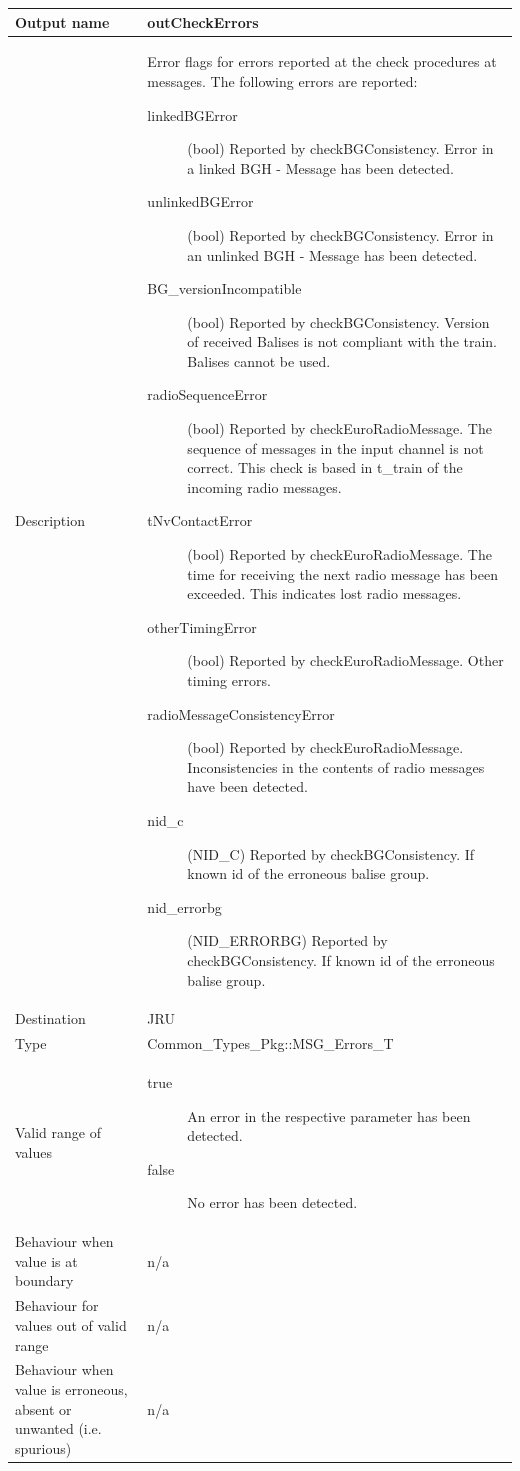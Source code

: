\begin{longtable}{p{}p{}}
\toprule
Output name				& outCheckErrors \\
\midrule
Description				& Error flags for errors reported at the check procedures at messages. The following errors are reported:
\begin{description}
\item[linkedBGError](bool) Reported by checkBGConsistency. Error in a linked BGH - Message has been detected.
\item[unlinkedBGError](bool) Reported by checkBGConsistency. Error in an unlinked BGH - Message has been detected.
\item[BG\_versionIncompatible](bool) Reported by checkBGConsistency. Version of received Balises is not compliant with the train. Balises cannot be used.
\item[radioSequenceError](bool) Reported by checkEuroRadioMessage. The sequence of messages in the input channel is not correct. This check is based in t\_train of the incoming radio messages.
\item[tNvContactError](bool) Reported by checkEuroRadioMessage. The time for receiving the next radio message has been exceeded. This indicates lost radio messages.
\item[otherTimingError](bool) Reported by checkEuroRadioMessage. Other timing errors.
\item[radioMessageConsistencyError](bool) Reported by checkEuroRadioMessage. Inconsistencies in the contents of radio messages have been detected.
\item[nid\_c](NID\_C) Reported by checkBGConsistency. If known id of the erroneous balise group.
\item[nid\_errorbg](NID\_ERRORBG) Reported by checkBGConsistency. If known id of the erroneous balise group.
\end{description}
\\
\midrule
Destination				& JRU\\ 
\midrule
Type					& Common\_Types\_Pkg::MSG\_Errors\_T\\
\midrule
Valid range of values	& \begin{description}
\item[true] An error in the respective parameter has been detected.
\item[false] No error has been detected.
\end{description} \\
\midrule
Behaviour when value is at boundary	& n/a\\
\midrule
Behaviour for values out of valid range	& n/a\\
\midrule
Behaviour when value is erroneous, absent or unwanted (i.e. spurious) & n/a\\
\end{longtable}


